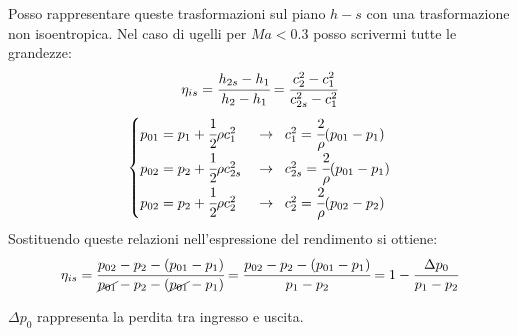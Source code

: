 Posso rappresentare queste trasformazioni sul piano $h-s$ con una trasformazione non isoentropica. Nel caso di ugelli per $Ma < 0.3$ posso scrivermi tutte le grandezze: 
\begin{align*}
\eta_{is} = \cfrac{h_{2s} - h_1}{h_2-h_1} = \cfrac{c_2^2 - c_1^2}{c_{2s}^2 - c_1^2}
\end{align*}
\begin{align*}
\begin{cases}
p_{01} = p_1 + \cfrac{1}{2} \rho c_1^2 \;& \to  \;\; c_1^2 = \cfrac{2}{\rho} (p_{01} - p_1)\\
p_{02} = p_2 + \cfrac{1}{2} \rho c_{2s}^2 \;& \to  \;\; c_{2s}^2 = \cfrac{2}{\rho} (p_{01} - p_1)\\
p_{02} = p_2 + \cfrac{1}{2} \rho c_2^2 \;& \to  \;\; c_2^2 = \cfrac{2}{\rho} (p_{02} - p_2)
\end{cases}
\end{align*}
Sostituendo queste relazioni nell'espressione del rendimento si ottiene:
\begin{align*}
\eta_{is} = \cfrac{p_{02} - p_2 - (p_{01} - p_1)}{\cancel{p_{01}} - p_2 - (\cancel{p_{01}} - p_1)}=\cfrac{p_{02} - p_2 -(p_{01} - p_1)}{p_1-p_2}=1- \cfrac{\Delta p_0}{p_1 - p_2}
\end{align*}

$\Delta p_0$ rappresenta la perdita tra ingresso e uscita. 

